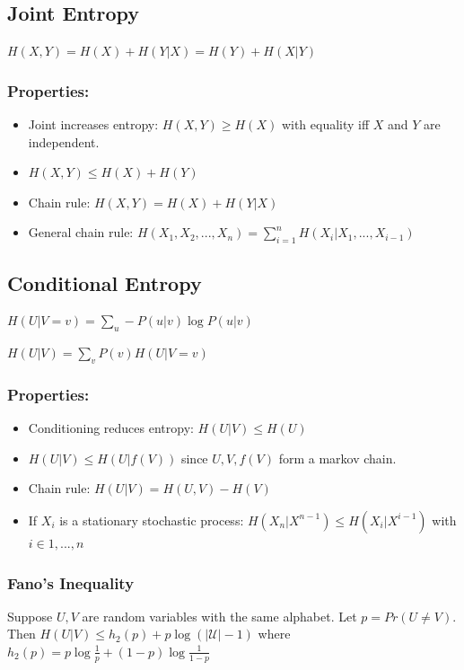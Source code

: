 \documentclass[10pt,a4paper,landscape]{article}
\begin{document}
\begin{multicols*}{4}
\subsection{Joint Entropy}
$H(X,Y) = H(X) + H(Y | X) = H(Y) + H(X | Y)$

\subsubsection{Properties:}
\begin{itemize}
	\item Joint increases entropy: $H(X, Y) \geq H(X)$ with equality iff $X$ and $Y$ are independent.
	\item $H(X,Y) \leq H(X) + H(Y)$
	\item Chain rule: $H(X, Y) = H(X) + H(Y | X)$
	\item General chain rule: $H(X_1, X_2, ..., X_n) = \sum_{i=1}^n H(X_i | X_1, ..., X_{i-1})$
\end{itemize}


\subsection{Conditional Entropy}

$H(U | V = v) = \sum_u - P(u | v) \log P(u | v)$

$H(U | V) = \sum_v P(v) H(U | V = v)$


\subsubsection{Properties:}
\begin{itemize}
	\item Conditioning reduces entropy: $H(U | V) \leq H(U)$
	\item $H(U | V) \leq H(U | f(V))$ since $U, V, f(V)$ form a markov chain.
	\item Chain rule: $H( U | V) = H(U,V) - H(V)$
	\item If $X_i$ is a stationary stochastic process: $H(X_n | X^{n-1}) \leq H(X_i | X^{i-1})$ with $i \in 1, ..., n$
\end{itemize}

\subsubsection{Fano's Inequality}
Suppose $U,V$ are random variables with the same alphabet. Let $p=Pr(U \neq V)$. Then $ H(U|V) \leq h_2(p) + p\log (|\mathcal{U}|-1)$ where $h_2(p) = p\log \frac{1}{p} + (1-p)\log\frac{1}{1-p}$


\end{multicols*}
\end{document}
